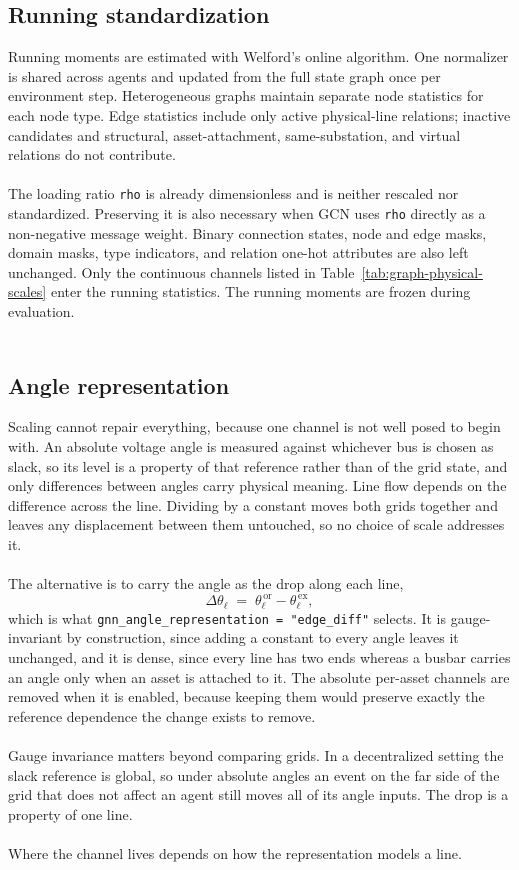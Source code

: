 \subsection{Running standardization}

Running moments are estimated with Welford's online algorithm. One normalizer
is shared across agents and updated from the full state graph once per
environment step. Heterogeneous graphs maintain separate node statistics for
each node type. Edge statistics include only active physical-line relations;
inactive candidates and structural, asset-attachment, same-substation, and
virtual relations do not contribute.
\\
\\
The loading ratio \texttt{rho} is already dimensionless and is neither rescaled
nor standardized. Preserving it is also necessary when GCN uses \texttt{rho}
directly as a non-negative message weight. Binary connection states, node and
edge masks, domain masks, type indicators, and relation one-hot attributes are
also left unchanged. Only the continuous channels listed in
Table~\ref{tab:graph-physical-scales} enter the running statistics.
The running moments are frozen during evaluation.
\\
\\
\subsection{Angle representation}
\label{sec:line-node-angle}

Scaling cannot repair everything, because one channel is not well posed to begin
with. An absolute voltage angle is measured against whichever bus is chosen as
slack, so its level is a property of that reference rather than of the grid
state, and only differences between angles carry physical meaning. Line flow
depends on the difference across the line. Dividing by a constant moves both
grids together and leaves any displacement between them untouched, so no choice
of scale addresses it.
\\
\\
The alternative is to carry the angle as the drop along each line,
\[
  \Delta\theta_{\ell} \;=\; \theta^{\,\mathrm{or}}_{\ell} - \theta^{\,\mathrm{ex}}_{\ell},
\]
which is what \texttt{gnn\_angle\_representation = "edge\_diff"} selects. It is
gauge-invariant by construction, since adding a constant to every angle leaves
it unchanged, and it is dense, since every line has two ends whereas a busbar
carries an angle only when an asset is attached to it. The absolute per-asset
channels are removed when it is enabled, because keeping them would preserve
exactly the reference dependence the change exists to remove.
\\
\\
Gauge invariance matters beyond comparing grids. In a decentralized setting the
slack reference is global, so under absolute angles an event on the far side of
the grid that does not affect an agent still moves all of its angle inputs. The
drop is a property of one line.
\\
\\
Where the channel lives depends on how the representation models a line.

